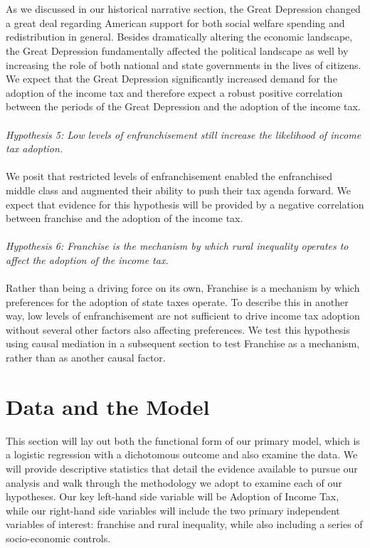 \documentclass[letter, 12pt]{article}
\begin{document}
\\
\\
As we discussed in our historical narrative section, the Great Depression changed a great deal regarding American support for both social welfare spending and redistribution in general. Besides dramatically altering the economic landscape, the Great Depression fundamentally affected the political landscape as well by increasing the role of both national and state governments in the lives of citizens. We expect that the Great Depression significantly increased demand for the adoption of the income tax and therefore expect a robust positive correlation between the periods of the Great Depression and the adoption of the income tax.
\\
\\
\emph{Hypothesis 5: Low levels of enfranchisement still increase the likelihood of income tax adoption.}
\\
\\
We posit that restricted levels of enfranchisement enabled the enfranchised middle class and augmented their ability to push their tax agenda forward. We expect that evidence for this hypothesis will be provided by a negative correlation between franchise and the adoption of the income tax.
\\
\\
\emph{Hypothesis 6: Franchise is the mechanism by which rural inequality operates to affect the adoption of the income tax.}
\\
\\
Rather than being a driving force on its own, Franchise is a mechanism by which preferences for the adoption of state taxes operate. To describe this in another way, low levels of enfranchisement are not sufficient to drive income tax adoption without several other factors also affecting preferences. We test this hypothesis using causal mediation in a subsequent section to test Franchise as a mechanism, rather than as another causal factor.

\section{Data and the Model}

This section will lay out both the functional form of our primary model, which is a logistic regression with a dichotomous outcome and also examine the data. We will provide descriptive statistics that detail the evidence available to pursue our analysis and walk through the methodology we adopt to examine each of our hypotheses. Our key left-hand side variable will be Adoption of Income Tax, while our right-hand side variables will include the two primary independent variables of interest: franchise and rural inequality, while also including a series of socio-economic controls. 
\end{document}
